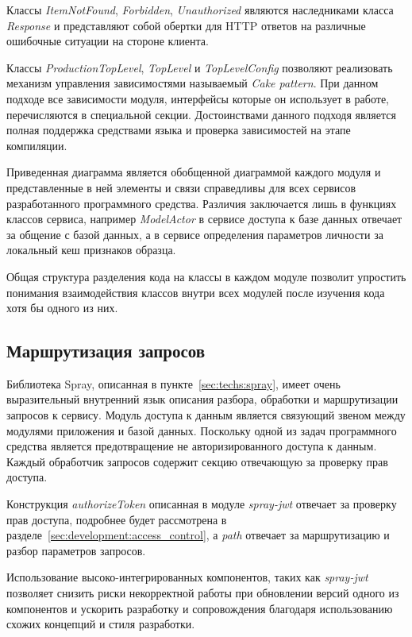 Классы \emph{ItemNotFound}, \emph{Forbidden}, \emph{Unauthorized} являются наследниками класса \emph{Response} и представляют собой обертки для HTTP ответов на различные ошибочные ситуации на стороне клиента.

Классы \emph{ProductionTopLevel}, \emph{TopLevel} и \emph{TopLevelConfig} позволяют реализовать механизм управления зависимостями называемый \emph{Cake pattern}. При данном подходе все зависимости модуля, интерфейсы которые он использует в работе, перечисляются в специальной секции. Достоинствами данного подходя является полная поддержка средствами языка и проверка зависимостей на этапе компиляции.

Приведенная диаграмма является обобщенной диаграммой каждого модуля и представленные в ней элементы и связи справедливы для всех сервисов разработанного программного средства. Различия заключается лишь в функциях классов сервиса, например \emph{ModelActor} в сервисе доступа к базе данных отвечает за общение с базой данных, а в сервисе определения параметров личности за локальный кеш признаков образца.

Общая структура разделения кода на классы в каждом модуле позволит упростить понимания взаимодействия классов внутри всех модулей после изучения кода хотя бы одного из них.

\subsection{Маршрутизация запросов}
Библиотека Spray, описанная в пункте~\ref{sec:techs:spray}, имеет очень выразительный внутренний язык описания разбора, обработки и маршрутизации запросов к сервису. Модуль доступа к данным является связующий звеном между модулями приложения и базой данных. Поскольку одной из задач программного средства является предотвращение не авторизированного доступа к данным. Каждый обработчик запросов содержит секцию отвечающую за проверку прав доступа.

Конструкция \emph{authorizeToken} описанная в модуле \emph{spray-jwt} отвечает за проверку прав доступа, подробнее будет рассмотрена в разделе~\ref{sec:development:access_control}, а \emph{path} отвечает за маршрутизацию и разбор параметров запросов. 

Использование высоко-интегрированных компонентов, таких как \emph{spray-jwt} позволяет снизить риски некорректной работы при обновлении версий одного из компонентов и ускорить разработку и сопровождения благодаря использованию схожих концепций и стиля разработки.

